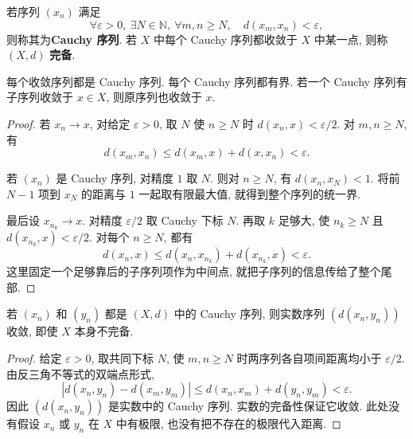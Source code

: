 \begin{definition}\label{ch:seq:def-cauchy}
若序列 $(x_n)$ 满足
\[
 \forall\varepsilon>0,\ \exists N\in\mathbb{N},\
 \forall m,n\ge N,\quad d(x_m,x_n)<\varepsilon,
\]
则称其为\textbf{Cauchy 序列}. 若 $X$ 中每个 Cauchy 序列都收敛于 $X$ 中某一点, 则称 $(X,d)$ \textbf{完备}.
\end{definition}

\begin{proposition}\label{ch:seq:cauchy-properties}
每个收敛序列都是 Cauchy 序列. 每个 Cauchy 序列都有界. 若一个 Cauchy 序列有子序列收敛于 $x\in X$, 则原序列也收敛于 $x$.
\end{proposition}
\begin{proof}
若 $x_n\to x$, 对给定 $\varepsilon>0$, 取 $N$ 使 $n\ge N$ 时 $d(x_n,x)<\varepsilon/2$. 对 $m,n\ge N$, 有
\[
 d(x_m,x_n)\le d(x_m,x)+d(x,x_n)<\varepsilon.
\]

若 $(x_n)$ 是 Cauchy 序列, 对精度 $1$ 取 $N$. 则对 $n\ge N$, 有 $d(x_n,x_N)<1$. 将前 $N-1$ 项到 $x_N$ 的距离与 $1$ 一起取有限最大值, 就得到整个序列的统一界.

最后设 $x_{n_k}\to x$. 对精度 $\varepsilon/2$ 取 Cauchy 下标 $N$. 再取 $k$ 足够大, 使 $n_k\ge N$ 且 $d(x_{n_k},x)<\varepsilon/2$. 对每个 $n\ge N$, 都有
\[
 d(x_n,x)\le d(x_n,x_{n_k})+d(x_{n_k},x)<\varepsilon.
\]
这里固定一个足够靠后的子序列项作为中间点, 就把子序列的信息传给了整个尾部.
\end{proof}

\begin{proposition}\label{ch:seq:cauchy-distance}
若 $(x_n)$ 和 $(y_n)$ 都是 $(X,d)$ 中的 Cauchy 序列, 则实数序列 $(d(x_n,y_n))$ 收敛, 即使 $X$ 本身不完备.
\end{proposition}
\begin{proof}
给定 $\varepsilon>0$, 取共同下标 $N$, 使 $m,n\ge N$ 时两序列各自项间距离均小于 $\varepsilon/2$. 由反三角不等式的双端点形式,
\[
 |d(x_n,y_n)-d(x_m,y_m)|
 \le d(x_n,x_m)+d(y_n,y_m)<\varepsilon.
\]
因此 $(d(x_n,y_n))$ 是实数中的 Cauchy 序列. 实数的完备性保证它收敛. 此处没有假设 $x_n$ 或 $y_n$ 在 $X$ 中有极限, 也没有把不存在的极限代入距离.
\end{proof}

